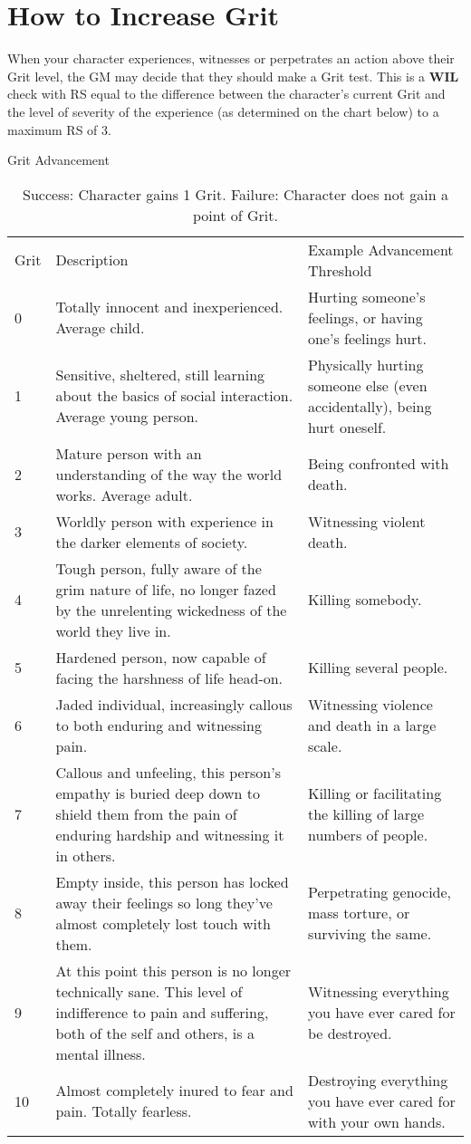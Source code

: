 \documentclass[oneside,11pt,english]{book}
\begin{document}
\section{How to Increase Grit}
When your character experiences, witnesses or perpetrates an action above their Grit level, the GM may 
decide that they should make a Grit test. This is a \textbf{WIL} check with RS equal to the difference between the character’s current Grit and the level of severity of the experience (as determined on the chart below) to a maximum RS of 3. 

\begin{table}
	\centering
	\caption{Grit Advancement}
	\label{tab:GritAdvancement}
\begin{tabu} spread 0pt {lXX}
Grit&Description&Example Advancement Threshold\\
0&Totally innocent and inexperienced. Average child.&Hurting someone’s feelings, or having one’s feelings hurt. \\
1&Sensitive, sheltered, still learning about the basics of social interaction. Average young person. & Physically hurting someone else (even accidentally), being hurt oneself. \\
2& Mature person with an understanding of the way the world works. Average adult. &Being confronted with death. \\
3&Worldly person with experience in the darker elements of society.& Witnessing violent death.\\
4&Tough person, fully aware of the grim nature of life, no longer fazed by the unrelenting wickedness of the world they live in. &Killing somebody. \\
5& Hardened person, now capable of facing the harshness of life head-on.&Killing several people. \\
6& Jaded individual, increasingly callous to both enduring and witnessing pain. &Witnessing violence and death in a large scale. \\
7& Callous and unfeeling, this person’s empathy is buried deep down to shield them from the pain of enduring hardship and witnessing it in others. &Killing or facilitating the killing of large numbers of people. \\
8& Empty inside, this person has locked away their feelings so long they’ve almost completely lost touch with them. &Perpetrating genocide, mass torture, or surviving the same.\\
9&At this point this person is no longer technically sane. This level of indifference to pain and suffering, both of the self and others, is a mental illness. &Witnessing everything you have ever cared for be destroyed. \\
10& Almost completely inured to fear and pain. Totally fearless. &Destroying everything you have ever cared for with your own hands. \\
\end{tabu}
\vspace{0.5 cm}
		\caption*{Success: Character gains 1 Grit. Failure: Character does not gain a point of Grit.} %
\end{table} 
\end{document}
